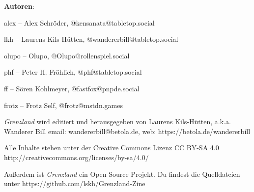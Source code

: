 \documentclass[11pt]{wbzine}
\begin{document}
\textbf{Autoren}:

alex -- Alex Schröder, @kensanata@tabletop.social

lkh -- Laurens Kils-Hütten, @wandererbill@tabletop.social

olupo -- Olupo, @Olupo@rollenspiel.social

phf -- Peter H. Fröhlich, @phf@tabletop.social

ff -- Sören Kohlmeyer, @fastfox@pnpde.social

frotz -- Frotz Self, @frotz@mstdn.games

\textit{Grenzland} wird editiert und
herausgegeben von Laurens Kils-Hütten,
a.k.a. Wanderer Bill
email: wandererbill@betola.de, web: https://betola.de/wandererbill

Alle Inhalte stehen unter der Creative Commons Lizenz
CC BY-SA 4.0\\
http://creativecommons.org/licenses/by-sa/4.0/

Außerdem ist \textit{Grenzland} ein Open Source Projekt. Du
findest die Quelldateien unter
https://github.com/lskh/Grenzland-Zine

\newpage\thispagestyle{empty}\null

\end{document}
